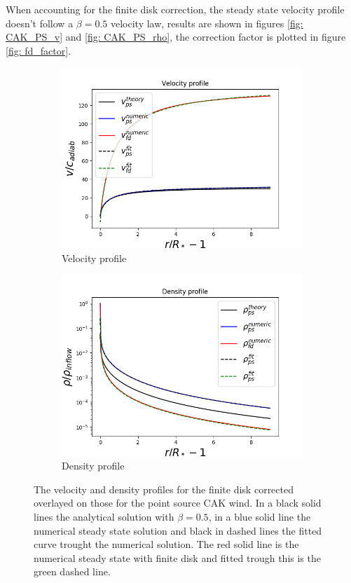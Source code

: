 When accounting for the finite disk correction, the steady state velocity profile doesn't follow a $\beta = 0.5$ velocity law, results are shown in figures \ref{fig: CAK_PS_v} and \ref{fig: CAK_PS_rho}, the correction factor is plotted in figure \ref{fig: fd_factor}. 

\begin{figure}
\centering
\begin{subfigure}{.8\textwidth}
\includegraphics[width = \textwidth]{CAK_fd_velocity_profile.png}
\caption{Velocity profile}
\label{fig: CAK_fd_v}
\end{subfigure}
\begin{subfigure}{.8\textwidth}
\centering
\includegraphics[width = \textwidth]{CAK_fd_density_profile.png}
\caption{Density profile}
\label{fig: CAK_fd_rho}
\end{subfigure}
\caption{The velocity and density profiles for the finite disk corrected overlayed on those for the point source CAK wind.  In a black solid lines the analytical solution with $\beta = 0.5$, in a blue solid line the numerical steady state solution and black in dashed lines the fitted curve trought the numerical solution. The red solid line is the numerical steady state with finite disk and fitted trough this is the green dashed line.}
\label{•}
\end{figure}
